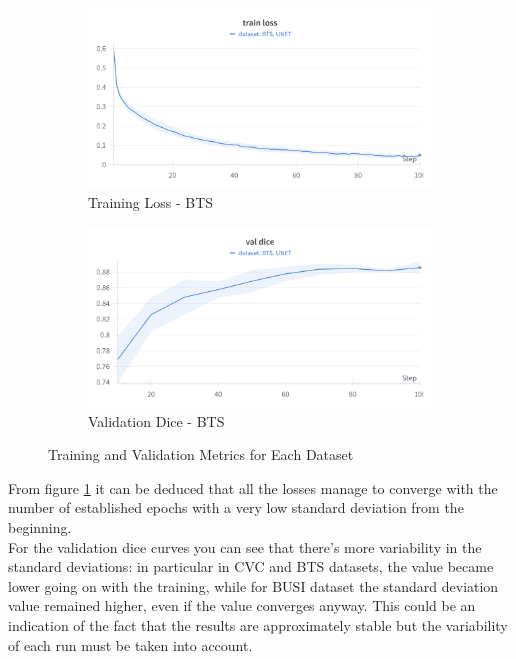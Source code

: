 \begin{figure}[h]
    \begin{subfigure}{0.45\textwidth}
        \centering
        \includegraphics[width=\linewidth]{images/unet/bts_train_loss.png}
        \caption{Training Loss - BTS}
    \end{subfigure}
    \hfill
    \begin{subfigure}{0.45\textwidth}
        \centering
        \includegraphics[width=\linewidth]{images/unet/bts_val_dice.png}
        \caption{Validation Dice - BTS}
    \end{subfigure}
    
    \caption{Training and Validation Metrics for Each Dataset}
    \label{fig:training-validation-unet}
\end{figure}

From figure \ref{fig:training-validation-unet} it can be deduced that all the losses manage to converge with the number of established epochs with a very low standard deviation from the beginning.\\ For the validation dice curves you can see that there's more variability in the standard deviations: in particular in CVC and BTS datasets, the value became lower going on with the training, while for BUSI dataset the standard deviation value remained higher, even if the value converges anyway. This could be an indication of the fact that the results are approximately stable but the variability of each run must be taken into account.


